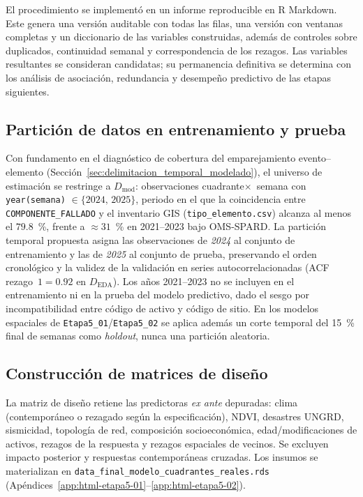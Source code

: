 El procedimiento se implementó en un informe reproducible en R Markdown. Este genera una versión auditable con todas las filas, una versión con ventanas completas y un diccionario de las variables construidas, además de controles sobre duplicados, continuidad semanal y correspondencia de los rezagos. Las variables resultantes se consideran candidatas; su permanencia definitiva se determina con los análisis de asociación, redundancia y desempeño predictivo de las etapas siguientes.

\subsection{Partición de datos en entrenamiento y prueba}
Con fundamento en el diagnóstico de cobertura del emparejamiento evento--elemento (Sección~\ref{sec:delimitacion_temporal_modelado}), el universo de estimación se restringe a $D_{\mathrm{mod}}$: observaciones cuadrante$\times$~semana con \texttt{year(semana)} $\in \{2024,\,2025\}$, periodo en el que la coincidencia entre \texttt{COMPONENTE\_FALLADO} y el inventario GIS (\texttt{tipo\_elemento.csv}) alcanza al menos el $79{.}8$~\%, frente a $\approx 31$~\% en 2021--2023 bajo OMS-SPARD. La partición temporal propuesta asigna las observaciones de \textit{2024} al conjunto de entrenamiento y las de \textit{2025} al conjunto de prueba, preservando el orden cronológico y la validez de la validación en series autocorrelacionadas (ACF rezago~$1 = 0{.}92$ en $D_{\mathrm{EDA}}$). Los años 2021--2023 no se incluyen en el entrenamiento ni en la prueba del modelo predictivo, dado el sesgo por incompatibilidad entre código de activo y código de sitio. En los modelos espaciales de \texttt{Etapa5\_01}/\texttt{Etapa5\_02} se aplica además un corte temporal del 15~\% final de semanas como \emph{holdout}, nunca una partición aleatoria.

\subsection{Construcción de matrices de diseño}
La matriz de diseño retiene las predictoras \emph{ex ante} depuradas: clima (contemporáneo o rezagado según la especificación), NDVI, desastres UNGRD, sismicidad, topología de red, composición socioeconómica, edad/modificaciones de activos, rezagos de la respuesta y rezagos espaciales de vecinos. Se excluyen impacto posterior y respuestas contemporáneas cruzadas. Los insumos se materializan en \texttt{data\_final\_modelo\_cuadrantes\_reales.rds} (Apéndices~\ref{app:html-etapa5-01}--\ref{app:html-etapa5-02}).

